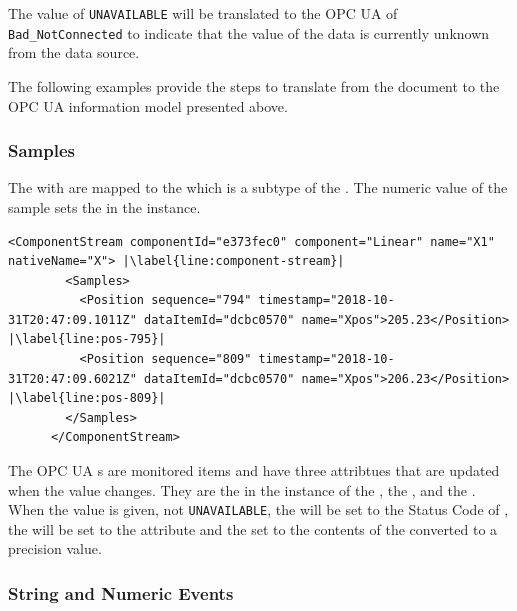 The value of \texttt{UNAVAILABLE} will be translated to the OPC UA   of \texttt{Bad_NotConnected} to indicate that the value of the data is currently unknown from the data source. 

The following examples provide the steps to translate from the  document to the OPC UA information model presented above.

\subsubsection{Samples}

The  with   are mapped to the  which is a subtype of the  . The numeric value of the sample sets the  in the   instance.

\begin{lstlisting}[firstnumber=last,escapechar=|,%
    caption={Linear Component Stream},label={lst:linear-component-stream}]
      <ComponentStream componentId="e373fec0" component="Linear" name="X1" nativeName="X"> |\label{line:component-stream}|
        <Samples>
          <Position sequence="794" timestamp="2018-10-31T20:47:09.1011Z" dataItemId="dcbc0570" name="Xpos">205.23</Position> |\label{line:pos-795}|
          <Position sequence="809" timestamp="2018-10-31T20:47:09.6021Z" dataItemId="dcbc0570" name="Xpos">206.23</Position> |\label{line:pos-809}|
        </Samples>
      </ComponentStream>
\end{lstlisting}

The OPC UA s are monitored items and have three attribtues that are updated when the value changes. They are the  in the instance of the , the , and the . When the value is given, not \texttt{UNAVAILABLE}, the  will be set to the Status Code of , the  will be set to the  attribute and the  set to the contents of the  converted to a  precision value.

\subsubsection{String and Numeric Events}\label{sec:sting-numeric-events}

